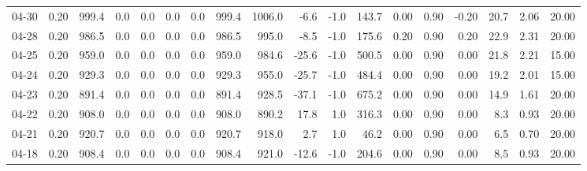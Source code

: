 \begin{threeparttable}
{\begin{tabular}{lrrrrrrrrrrrrrrrrr}
  04-30 &     0.20 &  999.4 &               0.0 &               0.0 &                0.0 &                0.0 &  999.4 & 1006.0 &       -6.6 &                     -1.0 &               143.7 &       0.00 &      0.90 &          -0.20 &             20.7 &            2.06 &                  20.00 \\
  04-28 &     0.20 &  986.5 &               0.0 &               0.0 &                0.0 &                0.0 &  986.5 &  995.0 &       -8.5 &                     -1.0 &               175.6 &       0.20 &      0.90 &           0.20 &             22.9 &            2.31 &                  20.00 \\
  04-25 &     0.20 &  959.0 &               0.0 &               0.0 &                0.0 &                0.0 &  959.0 &  984.6 &      -25.6 &                     -1.0 &               500.5 &       0.00 &      0.90 &           0.00 &             21.8 &            2.21 &                  15.00 \\
  04-24 &     0.20 &  929.3 &               0.0 &               0.0 &                0.0 &                0.0 &  929.3 &  955.0 &      -25.7 &                     -1.0 &               484.4 &       0.00 &      0.90 &           0.00 &             19.2 &            2.01 &                  15.00 \\
  04-23 &     0.20 &  891.4 &               0.0 &               0.0 &                0.0 &                0.0 &  891.4 &  928.5 &      -37.1 &                     -1.0 &               675.2 &       0.00 &      0.90 &           0.00 &             14.9 &            1.61 &                  20.00 \\
  04-22 &     0.20 &  908.0 &               0.0 &               0.0 &                0.0 &                0.0 &  908.0 &  890.2 &       17.8 &                      1.0 &               316.3 &       0.00 &      0.90 &           0.00 &              8.3 &            0.93 &                  20.00 \\
  04-21 &     0.20 &  920.7 &               0.0 &               0.0 &                0.0 &                0.0 &  920.7 &  918.0 &        2.7 &                      1.0 &                46.2 &       0.00 &      0.90 &           0.00 &              6.5 &            0.70 &                  20.00 \\
  04-18 &     0.20 &  908.4 &               0.0 &               0.0 &                0.0 &                0.0 &  908.4 &  921.0 &      -12.6 &                     -1.0 &               204.6 &       0.00 &      0.90 &           0.00 &              8.5 &            0.93 &                  20.00 \\

\end{tabular}}
\end{threeparttable}
